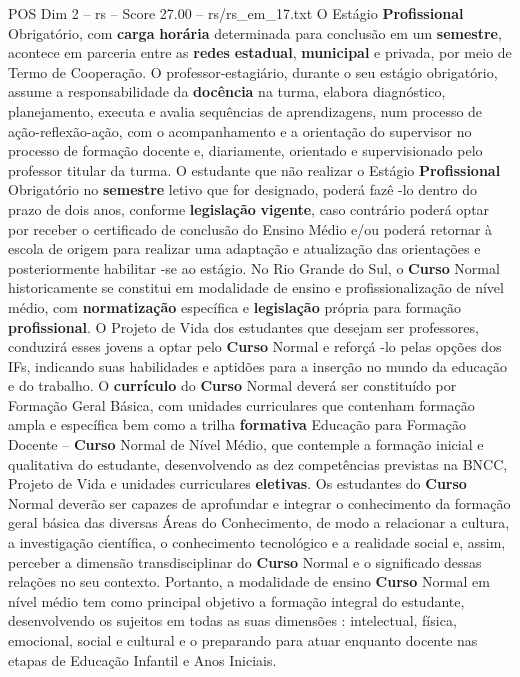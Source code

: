 \begin{textsample}{POS Dim 2 – rs – Score 27.00 – rs/rs\_em\_17.txt}
O Estágio \textbf{Profissional} Obrigatório, com \textbf{carga} \textbf{horária} determinada para conclusão em um \textbf{semestre}, acontece em parceria entre as \textbf{redes} \textbf{estadual}, \textbf{municipal} e privada, por meio de Termo de Cooperação.
O professor-estagiário, durante o seu estágio obrigatório, assume a responsabilidade da \textbf{docência} na turma, elabora diagnóstico, planejamento, executa e avalia sequências de aprendizagens, num processo de ação-reflexão-ação, com o acompanhamento e a orientação do supervisor no processo de formação docente e, diariamente, orientado e supervisionado pelo professor titular da turma.
O estudante que não realizar o Estágio \textbf{Profissional} Obrigatório no \textbf{semestre} letivo que for designado, poderá fazê -lo dentro do prazo de dois anos, conforme \textbf{legislação} \textbf{vigente}, caso contrário poderá optar por receber o certificado de conclusão do Ensino Médio e/ou poderá retornar à escola de origem para realizar uma adaptação e atualização das orientações e posteriormente habilitar -se ao estágio.
No Rio Grande do Sul, o \textbf{Curso} Normal historicamente se constitui em modalidade de ensino e profissionalização de nível médio, com \textbf{normatização} específica e \textbf{legislação} própria para formação \textbf{profissional}.
O Projeto de Vida dos estudantes que desejam ser professores, conduzirá esses jovens a optar pelo \textbf{Curso} Normal e reforçá -lo pelas opções dos IFs, indicando suas habilidades e aptidões para a inserção no mundo da educação e do trabalho.
O \textbf{currículo} do \textbf{Curso} Normal deverá ser constituído por Formação Geral Básica, com unidades curriculares que contenham formação ampla e específica bem como a trilha \textbf{formativa} Educação para Formação Docente – \textbf{Curso} Normal de Nível Médio, que contemple a formação inicial e qualitativa do estudante, desenvolvendo as dez competências previstas na BNCC, Projeto de Vida e unidades curriculares \textbf{eletivas}.
Os estudantes do \textbf{Curso} Normal deverão ser capazes de aprofundar e integrar o conhecimento da formação geral básica das diversas Áreas do Conhecimento, de modo a relacionar a cultura, a investigação científica, o conhecimento tecnológico e a realidade social e, assim, perceber a dimensão transdisciplinar do \textbf{Curso} Normal e o significado dessas relações no seu contexto.
Portanto, a modalidade de ensino \textbf{Curso} Normal em nível médio tem como principal objetivo a formação integral do estudante, desenvolvendo os sujeitos em todas as suas dimensões : intelectual, física, emocional, social e cultural e o preparando para atuar enquanto docente nas etapas de Educação Infantil e Anos Iniciais.

\end{textsample}
